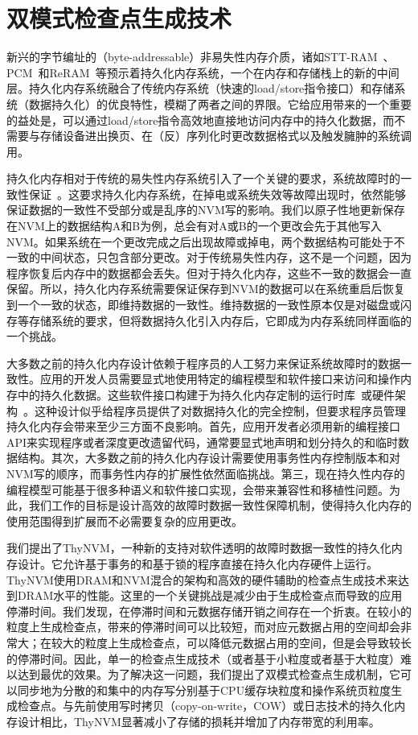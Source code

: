 \chapter{双模式检查点生成技术}
\label{chap:thynvm}

新兴的字节编址的（byte-addressable）非易失性内存介质，诸如STT-RAM~\cite{4443191}、PCM~\cite{Raoux:2008:PRA}和ReRAM~\cite{5607274}等预示着持久化内存系统，一个在内存和存储栈上的新的中间层。持久化内存系统融合了传统内存系统（快速的load/store指令接口）和存储系统（数据持久化）的优良特性，模糊了两者之间的界限。它给应用带来的一个重要的益处是，可以通过load/store指令高效地直接地访问内存中的持久化数据，而不需要与存储设备进出换页、在（反）序列化时更改数据格式以及触发臃肿的系统调用。

持久化内存相对于传统的易失性内存系统引入了一个关键的要求，系统故障时的一致性保证~\cite{Lamb:1991:ODS,Copeland:1989:CSR,Shapiro:1999:EFC:319151.319163}。这要求持久化内存系统，在掉电或系统失效等故障出现时，依然能够保证数据的一致性不受部分或是乱序的NVM写的影响。我们以原子性地更新保存在NVM上的数据结构A和B为例，总会有对A或B的一个更改会先于其他写入NVM。如果系统在一个更改完成之后出现故障或掉电，两个数据结构可能处于不一致的中间状态，只包含部分更改。对于传统易失性内存，这不是一个问题，因为程序恢复后内存中的数据都会丢失。但对于持久化内存，这些不一致的数据会一直保留。所以，持久化内存系统需要保证保存到NVM的数据可以在系统重启后恢复到一个一致的状态，即维持数据的一致性。维持数据的一致性原本仅是对磁盘或闪存等存储系统的要求，但将数据持久化引入内存后，它即成为内存系统同样面临的一个挑战。

大多数之前的持久化内存设计依赖于程序员的人工努力来保证系统故障时的数据一致性。应用的开发人员需要显式地使用特定的编程模型和软件接口来访问和操作内存中的持久化数据。这些软件接口构建于为持久化内存定制的运行时库~\cite{Condit:2009:BIT:1629575.1629589,Volos:2011:MLP:1950365.1950379}或硬件架构~\cite{Zhao:2013:KCP:2540708.2540744}。这种设计似乎给程序员提供了对数据持久化的完全控制，但要求程序员管理持久化内存会带来至少三方面不良影响。首先，应用开发者必须用新的编程接口API来实现程序或者深度更改遗留代码，通常要显式地声明和划分持久的和临时数据结构。其次，大多数之前的持久化内存设计需要使用事务性内存控制版本和对NVM写的顺序，而事务性内存的扩展性依然面临挑战。第三，现在持久性内存的编程模型可能基于很多种语义和软件接口实现，会带来兼容性和移植性问题。为此，我们工作的目标是设计高效的故障时数据一致性保障机制，使得持久化内存的使用范围得到扩展而不必需要复杂的应用更改。

我们提出了ThyNVM，一种新的支持对软件透明的故障时数据一致性的持久化内存设计。它允许基于事务的和基于锁的程序直接在持久化内存硬件上运行。ThyNVM使用DRAM和NVM混合的架构和高效的硬件辅助的检查点生成技术来达到DRAM水平的性能。这里的一个关键挑战是减少由于生成检查点而导致的应用停滞时间。我们发现，在停滞时间和元数据存储开销之间存在一个折衷。在较小的粒度上生成检查点，带来的停滞时间可以比较短，而对应元数据占用的空间却会非常大；在较大的粒度上生成检查点，可以降低元数据占用的空间，但是会导致较长的停滞时间。因此，单一的检查点生成技术（或者基于小粒度或者基于大粒度）难以达到最优的效果。为了解决这一问题，我们提出了双模式检查点生成机制，它可以同步地为分散的和集中的内存写分别基于CPU缓存块粒度和操作系统页粒度生成检查点。与先前使用写时拷贝（copy-on-write，COW）或日志技术的持久化内存设计相比，ThyNVM显著减小了存储的损耗并增加了内存带宽的利用率。

